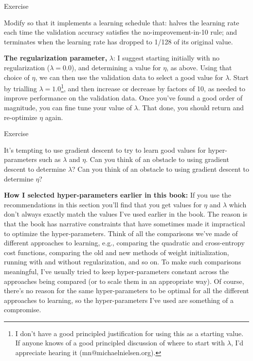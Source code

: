 \documentclass[a4paper,twoside,10pt]{book}
\begin{document}
\begin{exercize}{Exercise}
	\item Modify  so that it implements a learning schedule that: halves the learning rate each time the validation accuracy satisfies the no-improvement-in-10 rule; and terminates when the learning rate has dropped to 1/128 of its original value.
\end{exercize}
\textbf{The regularization parameter,} $\lambda$: I suggest starting initially with no regularization ($\lambda=0.0$), and determining a value for $\eta$, as above. Using that choice of $\eta$, we can then use the validation data to select a good value for $\lambda$. Start by trialling $\lambda=1.0$\footnote{I don't have a good principled justification for using this as a starting value. If anyone knows of a good principled discussion of where to start with $\lambda$, I'd appreciate hearing it (mn@michaelnielsen.org).}, and then increase or decrease by factors of 10, as needed to improve performance on the validation data. Once you've found a good order of magnitude, you can fine tune your value of $\lambda$. That done, you should return and re-optimize $\eta$ again.

\begin{exercize}{Exercise}
\item It's tempting to use gradient descent to try to learn good values for hyper-parameters such as $\lambda$ and $\eta$. Can you think of an obstacle to using gradient descent to determine $\lambda$? Can you think of an obstacle to using gradient descent to determine $\eta$?
\end{exercize}
\textbf{How I selected hyper-parameters earlier in this book:} If you use the recommendations in this section you'll find that you get values for $\eta$ and $\lambda$ which don't always exactly match the values I've used earlier in the book. The reason is that the book has narrative constraints that have sometimes made it impractical to optimize the hyper-parameters. Think of all the comparisons we've made of different approaches to learning, e.g., comparing the quadratic and cross-entropy cost functions, comparing the old and new methods of weight initialization, running with and without regularization, and so on. To make such comparisons meaningful, I've usually tried to keep hyper-parameters constant across the approaches being compared (or to scale them in an appropriate way). Of course, there's no reason for the same hyper-parameters to be optimal for all the different approaches to learning, so the hyper-parameters I've used are something of a compromise.
\end{document}
